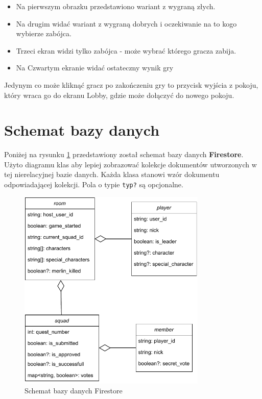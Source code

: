 \documentclass[12pt]{article}
\begin{document}
\begin{itemize}
    \item Na pierwszym obrazku przedstawiono wariant z wygraną złych.
    \item Na drugim widać wariant z wygraną dobrych i oczekiwanie na to kogo wybierze zabójca.
    \item Trzeci ekran widzi tylko zabójca - może wybrać którego gracza zabija.
    \item Na Czwartym ekranie widać ostateczny wynik gry
\end{itemize}
Jedynym co może kliknąć gracz po zakończeniu gry to przycisk wyjścia z pokoju, który wraca go do ekranu Lobby, gdzie może dołączyć do nowego pokoju.




\newpage
\section{Schemat bazy danych}
Poniżej na rysunku \ref{modele} przedstawiony został schemat bazy danych \textbf{Firestore}. Użyto diagramu klas aby lepiej zobrazować kolekcje dokumentów utworzonych w tej nierelacyjnej bazie danych. Każda klasa stanowi wzór dokumentu odpowiadającej kolekcji. Pola o typie \texttt{typ?} są opcjonalne.
\begin{figure}[!htb]
    \centerline{\includegraphics[width=0.8\textwidth]{./img/modele.pdf}}
    \caption{Schemat bazy danych Firestore}
    \centering
    \label{modele}
\end{figure}
\end{document}

